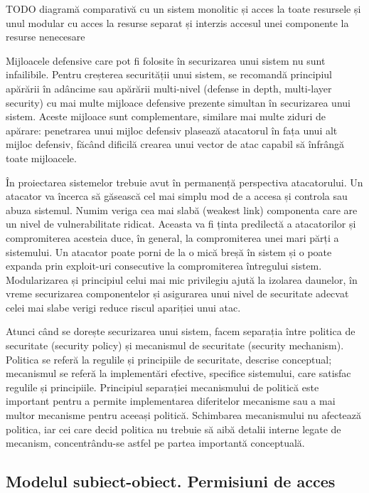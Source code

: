 TODO diagramă comparativă cu un sistem monolitic și acces la toate resursele și unul modular cu acces la resurse separat și interzis accesul unei componente la resurse nenecesare

Mijloacele defensive care pot fi folosite în securizarea unui sistem nu sunt infailibile. Pentru creșterea securității unui sistem, se recomandă principiul apărării în adâncime sau apărării multi-nivel (defense in depth, multi-layer security) cu mai multe mijloace defensive prezente simultan în securizarea unui sistem. Aceste mijloace sunt complementare, similare mai multe ziduri de apărare: penetrarea unui mijloc defensiv plasează atacatorul în fața unui alt mijloc defensiv, făcând dificilă crearea unui vector de atac capabil să înfrângă toate mijloacele.

În proiectarea sistemelor trebuie avut în permanență perspectiva atacatorului. Un atacator va încerca să găsească cel mai simplu mod de a accesa și controla sau abuza sistemul. Numim veriga cea mai slabă (weakest link) componenta care are un nivel de vulnerabilitate ridicat. Aceasta va fi ținta predilectă a atacatorilor și compromiterea acesteia duce, în general, la compromiterea unei mari părți a sistemului. Un atacator poate porni de la o mică breșă în sistem și o poate expanda prin exploit-uri consecutive la compromiterea întregului sistem. Modularizarea și principiul celui mai mic privilegiu ajută la izolarea daunelor, în vreme securizarea componentelor și asigurarea unui nivel de securitate adecvat celei mai slabe verigi reduce riscul apariției unui atac.

Atunci când se dorește securizarea unui sistem, facem separația între politica de securitate (security policy) și mecanismul de securitate (security mechanism). Politica se referă la regulile și principiile de securitate, descrise conceptual; mecanismul se referă la implementări efective, specifice sistemului, care satisfac regulile și principiile. Principiul separației mecanismului de politică este important pentru a permite implementarea diferitelor mecanisme sau a mai multor mecanisme pentru aceeași politică. Schimbarea mecanismului nu afectează politica, iar cei care decid politica nu trebuie să aibă detalii interne legate de mecanism, concentrându-se astfel pe partea importantă conceptuală.

\subsection{Modelul subiect-obiect. Permisiuni de acces}
\label{sec:sec:permissions}

